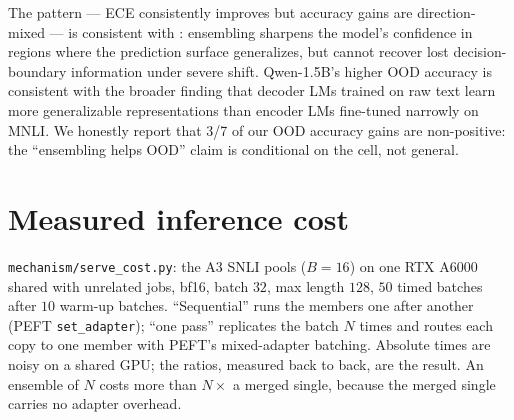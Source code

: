 \documentclass[11pt]{article}
\begin{document}
The pattern --- ECE consistently improves but accuracy gains are direction-mixed --- is consistent with \citet{lakshminarayanan2017simple}: ensembling sharpens the model's confidence in regions where the prediction surface generalizes, but cannot recover lost decision-boundary information under severe shift. Qwen-1.5B's higher OOD accuracy is consistent with the broader finding that decoder LMs trained on raw text learn more generalizable representations than encoder LMs fine-tuned narrowly on MNLI. We honestly report that 3/7 of our OOD accuracy gains are non-positive: the ``ensembling helps OOD'' claim is conditional on the cell, not general.

\section{Measured inference cost}\label{app:latency}
\texttt{mechanism/\allowbreak serve\_\allowbreak cost.\allowbreak py}: the A3 SNLI pools ($B{=}16$) on one RTX A6000 shared with unrelated jobs, bf16, batch $32$, max length $128$, $50$ timed batches after $10$ warm-up batches. ``Sequential'' runs the members one after another (PEFT \texttt{set\_adapter}); ``one pass'' replicates the batch $N$ times and routes each copy to one member with PEFT's mixed-adapter batching. Absolute times are noisy on a shared GPU; the ratios, measured back to back, are the result. An ensemble of $N$ costs more than $N\times$ a merged single, because the merged single carries no adapter overhead.
\end{document}
